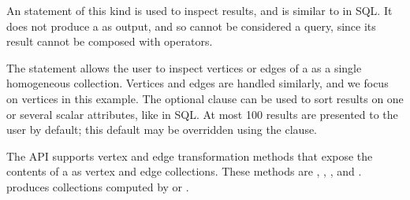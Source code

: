 An  statement of this kind is used to inspect results,
and is similar to  in SQL.  It does not produce a \tg
as output, and so cannot be considered a query, since its result
cannot be composed with \ql operators.

The  statement allows the user to inspect vertices or
edges of a \tg as a single homogeneous collection.  Vertices and edges
are handled similarly, and we focus on vertices in this example.  The
optional  clause can be used to sort results on one or
several scalar attributes, like in SQL.  At most 100 results are
presented to the user by default; this default may be overridden using
the  clause.

The \ql API supports vertex and edge transformation methods that
expose the contents of a \tg as vertex and edge collections.  These
methods are , ,
, and .   produces
collections computed by  or
. 

